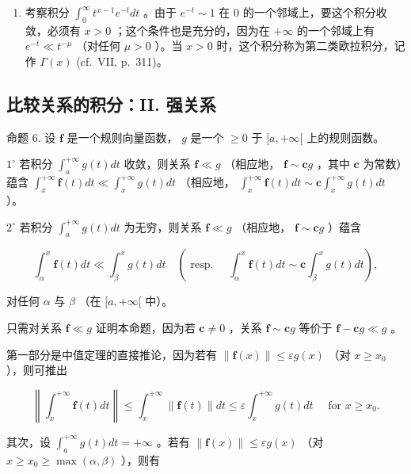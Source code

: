 \begin{enumerate}
\def\labelenumi{\arabic{enumi})}
\setcounter{enumi}{1}
\tightlist
\item
  考察积分 \(\int_0^\infty t^{x - 1}e^{-t}dt\) 。由于 \(e^{-t}\sim 1\) 在 0 的一个邻域上，要这个积分收敛，必须有 \(x > 0\) ；这个条件也是充分的，因为在 \(+\infty\) 的一个邻域上有 \(e^{-t}\ll t^{-\mu}\) （对任何 \(\mu >0\) ）。当 \(x > 0\) 时，这个积分称为第二类欧拉积分，记作 \(\Gamma (x)\) (cf.~VII, p.~311)。
\end{enumerate}

\subsection{比较关系的积分：II. 强关系}

命题 6. 设 \(\mathbf{f}\) 是一个规则向量函数， \(g\) 是一个 \(\geqslant 0\) 于 \([a, +\infty[\) 上的规则函数。

\(1^{\circ}\) 若积分 \(\int_{a}^{+\infty} g(t) dt\) 收敛，则关系 \(\mathbf{f} \ll g\) （相应地， \(\mathbf{f} \sim \mathbf{c}g\) ，其中 \(\mathbf{c}\) 为常数）蕴含 \(\int_{x}^{+\infty} \mathbf{f}(t) dt \ll \int_{x}^{+\infty} g(t) dt\) （相应地， \(\int_{x}^{+\infty} \mathbf{f}(t) dt \sim \mathbf{c} \int_{x}^{+\infty} g(t) dt\) ）。

\(2^{\circ}\) 若积分 \(\int_{a}^{+\infty} g(t) dt\) 为无穷，则关系 \(\mathbf{f} \ll g\) （相应地， \(\mathbf{f} \sim \mathbf{c}g\) ）蕴含

\[
\int_ {\alpha} ^ {x} \mathbf {f} (t) d t \ll \int_ {\beta} ^ {x} g (t) d t \quad (\text { resp. } \quad \int_ {\alpha} ^ {x} \mathbf {f} (t) d t \sim \mathbf {c} \int_ {\beta} ^ {x} g (t) d t),
\]

对任何 \(\alpha\) 与 \(\beta\) （在 \([a, +\infty[\) 中）。

只需对关系 \(\mathbf{f} \ll g\) 证明本命题，因为若 \(\mathbf{c} \neq 0\) ，关系 \(\mathbf{f} \sim \mathbf{c}g\) 等价于 \(\mathbf{f} - \mathbf{c}g \ll g\) 。

第一部分是中值定理的直接推论，因为若有 \(\|\mathbf{f}(x)\| \leqslant \varepsilon g(x)\) （对 \(x \geqslant x_{0}\) ），则可推出

\[
\left\| \int_ {x} ^ {+ \infty} \mathbf {f} (t) d t \right\| \leqslant \int_ {x} ^ {+ \infty} \| \mathbf {f} (t) \| d t \leqslant \varepsilon \int_ {x} ^ {+ \infty} g (t) d t \quad \text { for } x \geqslant x _ {0}.
\]

其次，设 \(\int_{a}^{+\infty} g(t) dt = +\infty\) 。若有 \(\| \mathbf{f}(x) \| \leqslant \varepsilon g(x)\) （对 \(x \geqslant x_0 \geqslant \max(\alpha, \beta)\) ），则有

